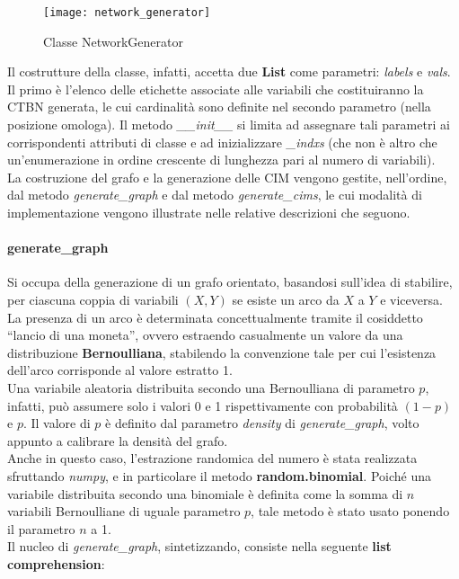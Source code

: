   \begin{figure}[H]
    \texttt{[image: network\_generator]}
    \centering
    \caption{Classe NetworkGenerator}
  \end{figure}

  Il costrutture della classe, infatti, accetta due \textbf{List} come parametri: \textit{labels} e \textit{vals}.
  Il primo è l'elenco delle etichette associate alle variabili che costituiranno la CTBN generata, 
  le cui cardinalità sono definite nel secondo parametro (nella posizione omologa). 
  Il metodo \textit{\_\_init\_\_} si limita ad assegnare tali parametri ai corrispondenti attributi 
  di classe e ad inizializzare \textit{\_indxs} (che non è altro che un'enumerazione in ordine crescente
  di lunghezza pari al numero di variabili).\\
  La costruzione del grafo e la generazione delle CIM vengono gestite, nell'ordine, dal metodo \textit{generate\_graph} e 
  dal metodo \textit{generate\_cims}, le cui modalità di implementazione vengono illustrate nelle
  relative descrizioni che seguono.

  \paragraph{generate\_graph}
  Si occupa della generazione di un grafo orientato, basandosi sull'idea di stabilire, per ciascuna coppia di variabili $(X, Y)$
  se esiste un arco da $X$ a $Y$ e viceversa. La presenza di un arco è determinata concettualmente tramite
  il cosiddetto ``lancio di una moneta'', ovvero estraendo casualmente un valore da una distribuzione \textbf{Bernoulliana},
  stabilendo la convenzione tale per cui l'esistenza dell'arco corrisponde al valore estratto 1.\\
  Una variabile aleatoria distribuita secondo una Bernoulliana di parametro $p$, infatti, può assumere
  solo i valori 0 e 1 rispettivamente con probabilità $(1 - p)$ e $p$. Il valore di $p$ è definito dal parametro
  \textit{density} di \textit{generate\_graph}, volto appunto a calibrare la densità del grafo.\\
  Anche in questo caso, l'estrazione randomica del numero è stata realizzata sfruttando \textit{numpy},
  e in particolare il metodo \textbf{random.binomial}. Poiché una variabile distribuita secondo una
  binomiale è definita come la somma di $n$ variabili Bernoulliane di uguale parametro $p$,
  tale metodo è stato usato ponendo il parametro $n$ a 1.\\
  Il nucleo di \textit{generate\_graph}, sintetizzando, consiste nella seguente \textbf{list comprehension}:

